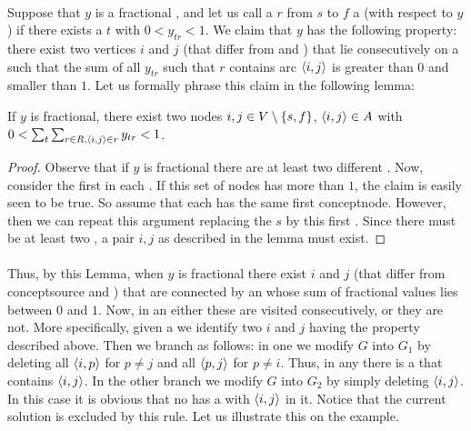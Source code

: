 \paragraph{}
Suppose that $y$ is a fractional , and let us call a  $r$ from $s$ to $f$ a  (with respect to $y$) if there exists a $t$ with $0<y_{tr}<1$. We claim that $y$ has the following property: there exist two vertices $i$ and $j$ (that differ from  and ) that lie consecutively on a  such that the sum of all $y_{tr}$ such that $r$ contains arc $\left\langle i,j \right\rangle$ is greater than $0$ and smaller than $1$. Let us formally phrase this claim in the following lemma:

\begin{lemma}
If $y$ is fractional, there exist two nodes $i,j\in V\setminus\left\{ s,f \right\}$, $\left\langle i,j \right\rangle\in A$ with $0<\sum_t{\sum_{r\in R,\left\langle i,j \right\rangle\in r}y_{tr}}<1$.
\begin{proof}
Observe that if $y$ is fractional there are at least two different . Now, consider the first  in each . If this set of nodes has  more than $1$, the claim is easily seen to be true. So assume that each  has the same first concept{node}. However, then we can repeat this argument replacing the  $s$ by this first . Since there must be at least two , a pair $i,j$ as described in the lemma must exist.
\end{proof}
\end{lemma}

\paragraph{}
Thus, by this Lemma, when $y$ is fractional there exist  $i$ and $j$ (that differ from concept{source} and ) that are connected by an  whose sum of fractional values lies between $0$ and $1$. Now, in an  either these  are visited consecutively, or they are not. More specifically, given a  we identify two  $i$ and $j$ having the property described above. Then we branch as follows: in one  we modify $G$ into $G_1$ by deleting all  $\left\langle i,p \right\rangle$ for $p\neq j$ and all  $\left\langle p,j \right\rangle$ for $p\neq i$. Thus, in any  there is a  that contains  $\left\langle i,j \right\rangle$. In the other branch we modify $G$ into $G_2$ by simply deleting  $\left\langle i,j \right\rangle$. In this case it is obvious that no  has a  with  $\left\langle i,j \right\rangle$ in it. Notice that the current solution is excluded by this rule. Let us illustrate this  on the example.

